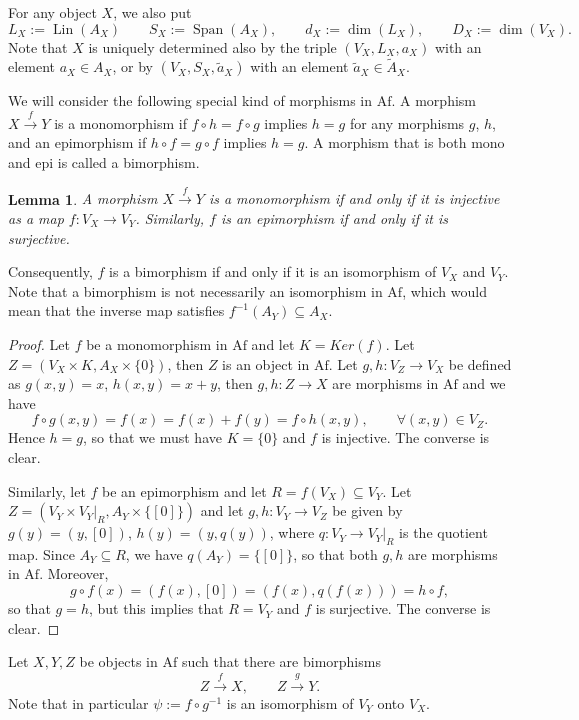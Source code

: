 \documentclass[12pt]{article}
\newtheorem{lemma}{Lemma}
\theoremstyle{definition}
\theoremstyle{remark}
\def\lin{\operatorname{Lin}}
\def\Span{\operatorname{Span}}
\def \Af{\mathrm{Af}}
\begin{document}
For any object $X$, we also put 
\[
L_X:=\lin(A_X)\qquad S_X:=\Span(A_X),\qquad  d_X:=\dim(L_X),\qquad D_X:=\dim(V_X).
\]
Note that $X$ is
uniquely determined also by the triple $(V_X,L_X,a_X)$ with  an element $a_X\in A_X$, or
by $(V_X,S_X,\tilde a_X)$ with an element $\tilde a_X\in \tilde A_X$. 

We will consider the following special kind of morphisms in $\Af$. 
A morphism $X\xrightarrow{f} Y$ is a monomorphism if $f\circ h=f\circ g$ implies $h=g$ for
any morphisms $g$, $h$, and an epimorphism if $h\circ f=g\circ f$ implies $h=g$. A
morphism that is both mono and epi is called a bimorphism.


\begin{lemma}\label{lemma:epimono} A morphism $X\xrightarrow{f} Y$ is a  monomorphism if and only
if  it is injective as a map $f:V_X\to V_Y$. Similarly, $f$ is an epimorphism if and only if it is surjective. 

\end{lemma}

Consequently, $f$ is a bimorphism if and only if  it is an isomorphism of $V_X$ and $V_Y$. Note that a
bimorphism is not necessarily an isomorphism in $\Af$, which would mean that the inverse
map satisfies $f^{-1}(A_Y)\subseteq A_X$.

\begin{proof} Let $f$ be a monomorphism in $\Af$
and let $K=Ker(f)$. Let $Z=(V_X\times K, A_X\times \{0\})$, then $Z$ is an object in
$\Af$. Let $g,h:V_Z\to V_X$ be defined as $g(x,y)=x$, $h(x,y)=x+y$, then
$g,h:Z\to X$ are morphisms in $\Af$ and we have
\[
f\circ g(x,y)=f(x)=f(x)+f(y)=f\circ h(x,y),\qquad \forall (x,y)\in V_Z.
\]
Hence $h=g$, so that we must have $K=\{0\}$ and $f$ is injective. The converse is clear.

Similarly, let  $f$ be an epimorphism and let $R=f(V_X)\subseteq V_Y$. Let $Z=(V_Y\times
V_Y|_R,
A_Y\times \{[0]\})$ and let $g,h:V_Y\to V_Z$ be given by $g(y)= (y,[0])$, $h(y)=(y, q(y))$,
where $q:V_Y\to V_Y|_R$ is the quotient map. Since $A_Y\subseteq R$, we have
$q(A_Y)=\{[0]\}$, so that both $g,h$ are morphisms in $\Af$. Moreover,
\[
g\circ f(x)=(f(x),[0])=(f(x),q(f(x)))= h\circ f,
\]
so that $g=h$, but this implies that $R=V_Y$ and $f$ is surjective. The converse is clear.


\end{proof}


Let $X,Y, Z$ be objects in $\Af$ such that there are bimorphisms 
\[
Z\xrightarrow{f} X,\qquad Z\xrightarrow{g} Y.
\]
Note that in particular $\psi:=f\circ g^{-1}$ is an isomorphism of $V_Y$ onto $V_X$. 
\end{document}
